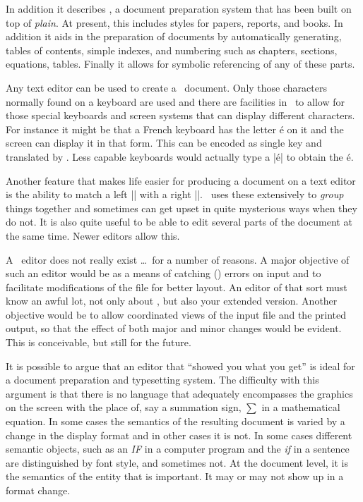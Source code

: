 In addition it describes \intex, a document preparation system that has been built on
top of {\it plain}. At present, this includes styles for papers, reports, and
books. In addition it aids in the preparation of documents by automatically
generating, tables of contents, simple indexes, and numbering such
as chapters, sections, equations, tables. Finally it allows for symbolic
referencing of any of these parts. 

Any text editor can be used to create a \tex\ document. Only those characters
normally found on a keyboard are used and there are facilities in \tex\ to
allow for those special keyboards and screen systems that can display
different characters. For instance it might be that a French keyboard has the
letter \'e on it and the screen can display it in that form. This can be
encoded as single key and translated by \tex. Less capable keyboards would
actually type a |\'e| to obtain the \'e.  

Another feature that makes life easier for producing a document on a text
editor is the ability to match a left |{| with a right |}|.
\tex\ uses these extensively to {\it group} things together and sometimes can
get upset in quite mysterious ways when they do not. 
It is also quite useful to be able to edit several parts of the
document at the same time. Newer editors allow this.

A \tex\ editor does not really exist \dots\ for a number of reasons. 
A major objective of such an editor  would be 
as a means of catching (\tex) errors on
input and to facilitate modifications of the file for better layout. An
editor of that sort must know an awful lot, not only about \tex, but also
your extended version. Another objective would be to allow coordinated views
of the input file and the \tex printed output,
so that the effect of both major and
minor changes would be evident. This is conceivable, but still for the
future. 

It is possible to argue that an editor that ``showed you what you get'' is
ideal for a document preparation and typesetting system. The difficulty with
this argument is that there is no language that adequately encompasses the
graphics on the screen with the place of, say a summation sign, $\sum$ in a
mathematical equation. In some cases the semantics of the resulting document
is varied by a change in the display format and in other cases it is not. 
In some cases different semantic objects, such as an {\it IF} in a computer
program and the {\it if } in a sentence are distinguished by font style, and
sometimes not. At the document level, it is the semantics of the entity that
is important. It may or may not show up in a format change.

